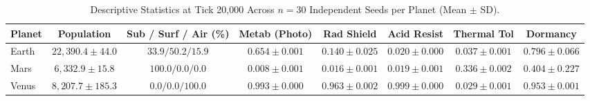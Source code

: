 \documentclass[conference]{IEEEtran}
\begin{document}
\begin{table}[t]
\centering
\caption{Descriptive Statistics at Tick 20,000 Across $n = 30$ Independent Seeds per Planet (Mean $\pm$ SD).}
\label{tab:descriptive}
\begin{tabular}{lccccccc}
\toprule
\textbf{Planet} & \textbf{Population} & \textbf{Sub / Surf / Air (\%)} & \textbf{Metab (Photo)} & \textbf{Rad Shield} & \textbf{Acid Resist} & \textbf{Thermal Tol} & \textbf{Dormancy} \\
\midrule
Earth & $22{,}390.4 \pm 44.0$ & $33.9 / 50.2 / 15.9$ & $0.654 \pm 0.001$ & $0.140 \pm 0.025$ & $0.020 \pm 0.000$ & $0.037 \pm 0.001$ & $0.796 \pm 0.066$ \\
Mars  & $6{,}332.9 \pm 15.8$  & $100.0 / 0.0 / 0.0$  & $0.008 \pm 0.001$ & $0.016 \pm 0.001$ & $0.019 \pm 0.001$ & $0.336 \pm 0.002$ & $0.404 \pm 0.227$ \\
Venus & $8{,}207.7 \pm 185.3$ & $0.0 / 0.0 / 100.0$  & $0.993 \pm 0.000$ & $0.963 \pm 0.002$ & $0.999 \pm 0.000$ & $0.029 \pm 0.001$ & $0.953 \pm 0.001$ \\
\bottomrule
\end{tabular}
\end{table}

\begin{table}[t]
\centering
\caption{Global Kruskal--Wallis ($H$) and Bonferroni-Adjusted Pairwise Mann--Whitney $U$ $p$-Values.}
\label{tab:significance}
\end{table}
\end{document}
